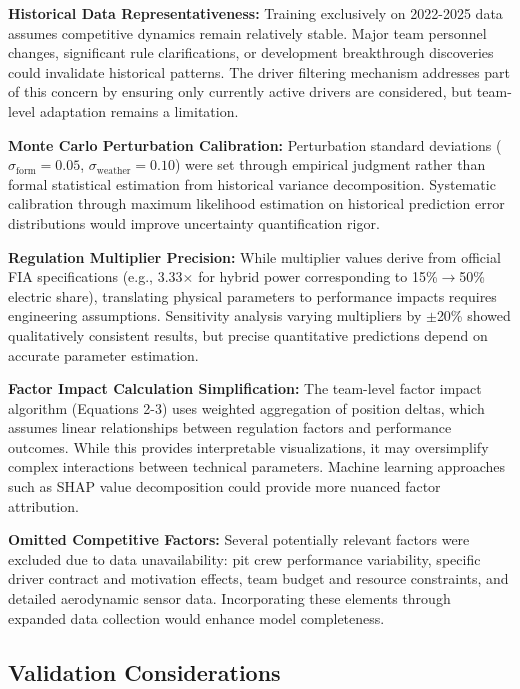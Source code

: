 \documentclass[conference]{IEEEtran}
\begin{document}
\textbf{Historical Data Representativeness:} Training exclusively on 2022-2025 data assumes competitive dynamics remain relatively stable. Major team personnel changes, significant rule clarifications, or development breakthrough discoveries could invalidate historical patterns. The driver filtering mechanism addresses part of this concern by ensuring only currently active drivers are considered, but team-level adaptation remains a limitation.

\textbf{Monte Carlo Perturbation Calibration:} Perturbation standard deviations ($\sigma_{\text{form}} = 0.05$, $\sigma_{\text{weather}} = 0.10$) were set through empirical judgment rather than formal statistical estimation from historical variance decomposition. Systematic calibration through maximum likelihood estimation on historical prediction error distributions would improve uncertainty quantification rigor.

\textbf{Regulation Multiplier Precision:} While multiplier values derive from official FIA specifications (e.g., 3.33$\times$ for hybrid power corresponding to 15\%$\to$50\% electric share), translating physical parameters to performance impacts requires engineering assumptions. Sensitivity analysis varying multipliers by $\pm$20\% showed qualitatively consistent results, but precise quantitative predictions depend on accurate parameter estimation.

\textbf{Factor Impact Calculation Simplification:} The team-level factor impact algorithm (Equations 2-3) uses weighted aggregation of position deltas, which assumes linear relationships between regulation factors and performance outcomes. While this provides interpretable visualizations, it may oversimplify complex interactions between technical parameters. Machine learning approaches such as SHAP value decomposition could provide more nuanced factor attribution.

\textbf{Omitted Competitive Factors:} Several potentially relevant factors were excluded due to data unavailability: pit crew performance variability, specific driver contract and motivation effects, team budget and resource constraints, and detailed aerodynamic sensor data. Incorporating these elements through expanded data collection would enhance model completeness.

\subsection{Validation Considerations}
\end{document}
